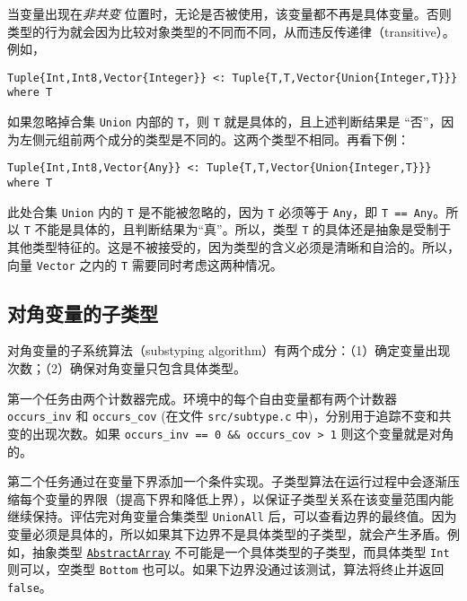 当变量出现在\emph{非共变} 位置时，无论是否被使用，该变量都不再是具体变量。否则类型的行为就会因为比较对象类型的不同而不同，从而违反传递律（transitive）。例如，




\begin{verbatim}
Tuple{Int,Int8,Vector{Integer}} <: Tuple{T,T,Vector{Union{Integer,T}}} where T
\end{verbatim}



如果忽略掉合集 \texttt{Union} 内部的 \texttt{T}，则 \texttt{T} 就是具体的，且上述判断结果是 “否”，因为左侧元组前两个成分的类型是不同的。这两个类型不相同。再看下例：




\begin{verbatim}
Tuple{Int,Int8,Vector{Any}} <: Tuple{T,T,Vector{Union{Integer,T}}} where T
\end{verbatim}



此处合集 \texttt{Union} 内的 \texttt{T} 是不能被忽略的，因为 \texttt{T} 必须等于 \texttt{Any}，即 \texttt{T == Any}。所以 \texttt{T} 不能是具体的，且判断结果为“真”。所以，类型 \texttt{T} 的具体还是抽象是受制于其他类型特征的。这是不被接受的，因为类型的含义必须是清晰和自洽的。所以，向量 \texttt{Vector} 之内的 \texttt{T} 需要同时考虑这两种情况。



\hypertarget{15982598794751332626}{}


\subsection{对角变量的子类型}



对角变量的子系统算法（substyping algorithm）有两个成分：（1）确定变量出现次数；（2）确保对角变量只包含具体类型。



第一个任务由两个计数器完成。环境中的每个自由变量都有两个计数器 \texttt{occurs\_inv} 和 \texttt{occurs\_cov} (在文件 \texttt{src/subtype.c} 中)，分别用于追踪不变和共变的出现次数。如果 \texttt{occurs\_inv == 0 \&\& occurs\_cov > 1} 则这个变量就是对角的。



第二个任务通过在变量下界添加一个条件实现。子类型算法在运行过程中会逐渐压缩每个变量的界限（提高下界和降低上界），以保证子类型关系在该变量范围内能继续保持。评估完对角变量合集类型 \texttt{UnionAll} 后，可以查看边界的最终值。因为变量必须是具体的，所以如果其下边界不是具体类型的子类型，就会产生矛盾。例如，抽象类型 \hyperlink{6514416309183787338}{\texttt{AbstractArray}} 不可能是一个具体类型的子类型，而具体类型 \texttt{Int} 则可以，空类型 \texttt{Bottom} 也可以。如果下边界没通过该测试，算法将终止并返回 \texttt{false}。



